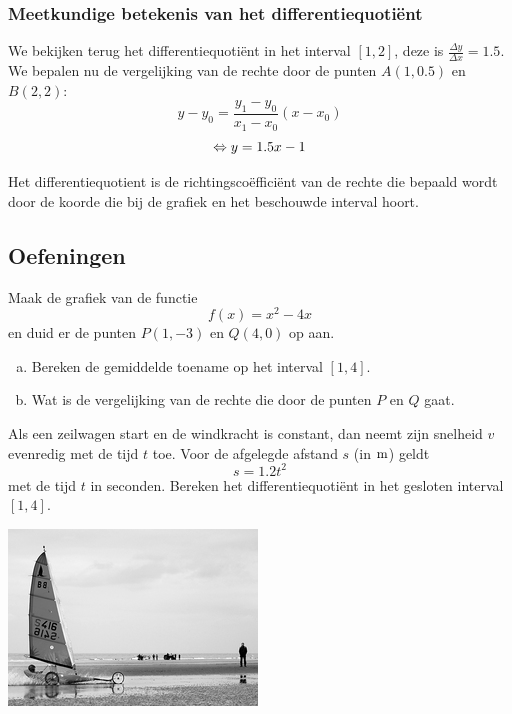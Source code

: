 \documentclass[12pt]{article}
\begin{document}
\subsubsection{Meetkundige betekenis van het differentiequotiënt}

We bekijken terug het differentiequotiënt in het interval $[1,2]$, deze is $\frac{\Delta y}{\Delta x}=1.5$. We bepalen nu de vergelijking van de rechte door de punten $A(1, 0.5)$ en $B(2,2)$:
$$y-y_0=\dfrac{y_1-y_0}{x_1-x_0}(x-x_0)$$
$$\Leftrightarrow y=1.5x-1$$

Het differentiequotient is de richtingscoëfficiënt van de rechte die bepaald wordt door de koorde die bij de grafiek en het beschouwde interval hoort.

\subsection{Oefeningen}

\begin{oefening}
  Maak de grafiek van de functie
  $$f(x)=x^2-4x$$
  en duid er de punten $P(1,-3)$ en $Q(4,0)$ op aan.
  \begin{enumerate}[(a)]
  \item Bereken de gemiddelde toename op het interval $[1,4]$.
  \item Wat is de vergelijking van de rechte die door de punten $P$ en $Q$ gaat.
  \end{enumerate}
\end{oefening}

\begin{oefening}
  Als een zeilwagen start en de windkracht is constant, dan neemt zijn snelheid $v$ evenredig met de tijd $t$ toe. Voor de afgelegde afstand $s$ (in $\m$) geldt
  $$s=1.2t^2$$
  met de tijd $t$ in seconden. Bereken het differentiequotiënt in het gesloten interval $[1,4]$.
  \begin{center}
    \includegraphics{zeilwagen}
  \end{center}
\end{oefening}
\end{document}
